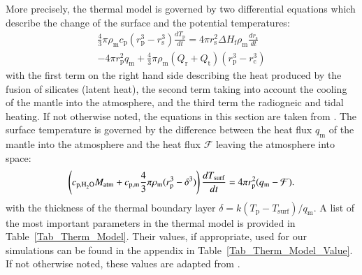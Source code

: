 \documentclass[paper=letterpaper,fontsize=12pt,oneside,twocolumn]{article}
\begin{document}
More precisely, the thermal model is governed by two differential equations which describe the change of the surface and the potential temperatures:
\begin{multline}
	\label{Deriv_Tpot}
	\frac{4}{3} \pi \rho_\mathrm{m} c_\mathrm{p} (r^3_\mathrm{p} - r^3_\mathrm{s}) \frac{dT_\mathrm{p}}{dt}     = 4 \pi r^2_\mathrm{s} \Delta H_\mathrm{f} \rho_\mathrm{m} \frac{dr_\mathrm{s}}{dt} \\ 
	   - 4 \pi r^2_\mathrm{p} q_\mathrm{m} + \frac{4}{3} \pi \rho_\mathrm{m} (Q_\mathrm{r} + Q_\mathrm{t}) (r^3_\mathrm{p} - r^3_\mathrm{c})
\end{multline}
with the first term on the right hand side describing the heat produced by the fusion of silicates (latent heat), the second term taking into account the cooling of the mantle into the atmosphere, and the third term the radiogneic and tidal heating.
If not otherwise noted, the equations in this section are taken from \citet{Schaefer2016}.
The surface temperature is governed by the difference between the heat flux $q_\mathrm{m}$ of the mantle into the atmosphere and the heat flux $\mathcal{F}$ leaving the atmosphere into space:
\begin{equation}
	\label{Deriv_Tsurf}
	\left( c_{\mathrm{p},\ce{H2O}} M_\mathrm{atm} +  c_\mathrm{p,m} \frac{4}{3} \pi \rho_\mathrm{m} (r^3_\mathrm{p} - \delta^3) \right) \frac{dT_\mathrm{surf}}{dt} = 4 \pi r^2_\mathrm{p} (q_\mathrm{m} - \mathcal{F}).
\end{equation}
with the thickness of the thermal boundary layer $\delta = k (T_\mathrm{p} - T_\mathrm{surf}) / q_\mathrm{m}$.
A list of the most important parameters in the thermal model is provided in Table~\ref{Tab_Therm_Model}. Their values, if appropriate, used for our simulations can be found in the appendix in Table~\ref{Tab_Therm_Model_Value}.
If not otherwise noted, these values are adapted from \citet{Schaefer2016}.
\end{document}
